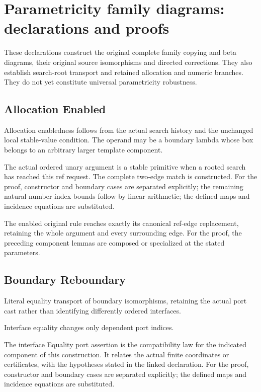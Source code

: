 \clearpage
\section{Parametricity family diagrams: declarations and proofs}
\label{sec:parametricity-families-concordance}
These declarations construct the original complete family copying and beta diagrams, their original source isomorphisms and directed corrections. They also establish search-root transport and retained allocation and numeric branches. They do not yet constitute universal parametricity robustness.

\subsection{Allocation Enabled}
Allocation enabledness follows from the actual search history and the unchanged local stable-value condition. The operand may be a boundary lambda whose box belongs to an arbitrary larger template component.

The actual ordered unary argument is a stable primitive when a rooted search has reached this ref request. The complete two-edge match is constructed.
For the proof, constructor and boundary cases are separated explicitly; the remaining natural-number index bounds follow by linear arithmetic; the defined maps and incidence equations are substituted.
\par{}

The enabled original rule reaches exactly its canonical ref-edge replacement, retaining the whole argument and every surrounding edge.
For the proof, the preceding component lemmas are composed or specialized at the stated parameters.
\par{}

\subsection{Boundary Reboundary}
Literal equality transport of boundary isomorphisms, retaining the actual port cast rather than identifying differently ordered interfaces.

Interface equality changes only dependent port indices.
\par{}

The interface Equality port assertion is the compatibility law for the indicated component of this construction. It relates the actual finite coordinates or certificates, with the hypotheses stated in the linked declaration.
For the proof, constructor and boundary cases are separated explicitly; the defined maps and incidence equations are substituted.
\par{}

